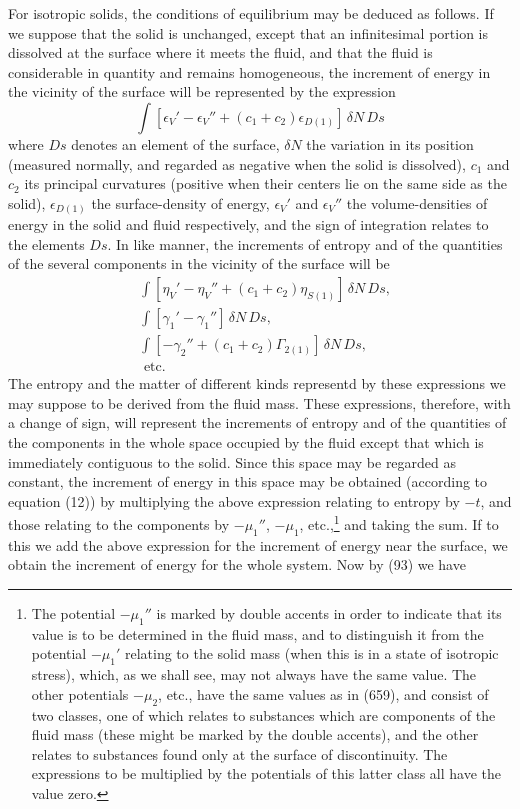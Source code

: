 \documentclass[12pt]{article}
\newcommand{\dd}{\delta}
\begin{document}
For isotropic solids, the conditions of equilibrium may be deduced as follows. If we suppose that the solid is unchanged, except that an infinitesimal portion is dissolved at the surface where it meets the fluid, and that the fluid is considerable in quantity and remains homogeneous, the increment of energy in the vicinity of the surface will be represented by the expression
$$\int \left[\epsilon_V'-\epsilon_V'' + (c_1 + c_2)\epsilon_{D(1)}\right] \, \dd N \,Ds$$
where $Ds$ denotes an element of the surface, $\dd N$ the variation in its position (measured normally, and regarded as negative when the solid is dissolved), $c_1$ and $c_2$ its principal curvatures (positive when their centers lie on the same side as the solid), $\epsilon_{D(1)}$ the surface-density of energy, $\epsilon_V'$ and $\epsilon_V''$ the volume-densities of energy in the solid and fluid respectively, and the sign of integration relates to the elements $Ds$. In like manner, the increments of entropy and of the quantities of the several components in the vicinity of the surface will be
\begin{align*}
& \int[\eta_V'-  \eta_V'' + (c_1 + c_2)\eta_{S(1)}] \, \dd N \, Ds,\\
& \int[\gamma_1'-\gamma_1''] \, \dd N \, Ds, \\
& \int[-\gamma_2'' +(c_1 + c_2)\Gamma_{2(1)}]\, \dd N \, Ds, \\
& \text{  etc.}\end{align*}
The entropy and the matter of different kinds representd by these expressions we may suppose to be derived from the fluid mass. These expressions, therefore, with a change of sign, will represent the increments of entropy and of the quantities of the components in the whole space occupied by the fluid except that which is immediately contiguous to the solid. Since this space may be regarded as constant, the increment of energy in this space may be obtained (according to equation (12)) by multiplying the above expression relating to entropy by $-t$, and those relating to the components by $-\mu_1''$, $-\mu_1$, etc.,\footnote{The potential $-\mu_1''$ is marked by double accents in order to indicate that its value is to be determined in the fluid mass, and to distinguish it from the potential $-\mu_1'$ relating to the solid mass (when this is in a state of isotropic stress), which, as we shall see, may not always have the same value. The other potentials $-\mu_2$, etc., have the same values as in (659), and consist of two classes, one of which relates to substances which are components of the fluid mass (these might be marked by the double accents), and the other relates to substances found only at the surface of discontinuity. The expressions to be multiplied by the potentials of this latter class all have the value zero.} and taking the sum. If to this we add the above expression for the increment of energy near the surface, we obtain the increment of energy for the whole system. Now by (93) we have
\end{document}
